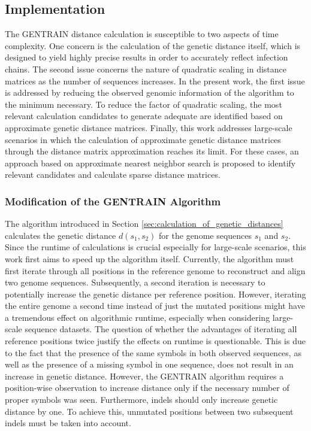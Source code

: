 \subsection{Implementation}
\label{sec:implementation}
The GENTRAIN distance calculation is susceptible to two aspects of time complexity. One concern is the calculation of the genetic distance itself, which is designed to yield highly precise results in order to accurately reflect infection chains. The second issue concerns the nature of quadratic scaling in distance matrices as the number of sequences increases. In the present work, the first issue is addressed by reducing the observed genomic information of the algorithm to the minimum necessary. To reduce the factor of quadratic scaling, the most relevant calculation candidates to generate adequate  are identified based on approximate genetic distance matrices. Finally, this work addresses large-scale scenarios in which the calculation of approximate genetic distance matrices through the distance matrix approximation reaches its limit. For these cases, an approach based on approximate nearest neighbor search is proposed to identify relevant candidates and calculate sparse distance matrices.

\subsubsection{Modification of the GENTRAIN Algorithm}
\label{sec:optimization_of_the_gentrain_algorithm}
The algorithm introduced in Section \ref{sec:calculation_of_genetic_distances} calculates the genetic distance $d(s_1,s_2)$ for the genome sequences $s_1$ and $s_2$.
Since the runtime of calculations is crucial especially for large-scale scenarios, this work first aims to speed up the algorithm itself. Currently, the algorithm must first iterate through all positions in the reference genome to reconstruct and align two genome sequences. Subsequently, a second iteration is necessary to potentially increase the genetic distance per reference position. However, iterating the entire genome a second time instead of just the mutated positions might have a tremendous effect on algorithmic runtime, especially when considering large-scale sequence datasets. The question of whether the advantages of iterating all reference positions twice justify the effects on runtime is questionable. This is due to the fact that the presence of the same symbols in both observed sequences, as well as the presence of a missing symbol in one sequence, does not result in an increase in genetic distance. However, the GENTRAIN algorithm requires a position-wise observation to increase distance only if the necessary number of proper symbols was seen. Furthermore, indels should only increase genetic distance by one. To achieve this, unmutated positions between two subsequent indels must be taken into account.

